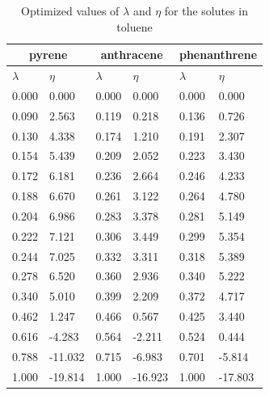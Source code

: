 \documentclass[
	12pt,				%
	openright,			%
	oneside,			%
	a4paper,			%
	english,			%
	brazil				%
	]{abntex2}
\begin{document}
\begin{apendicesenv}
\begin{table}[h]
	\centering
	\caption{Optimized values of $\lambda$ and $\eta$ for the solutes in toluene}
	\begin{tabular}{llllll}
		\hline
		\multicolumn{2}{c}{pyrene}& \multicolumn{2}{c}{anthracene}& \multicolumn{2}{c}{phenanthrene}\\
		\hline
		$\lambda$ & $\eta$ & $\lambda$ & $\eta$  & $\lambda$ & $\eta$   \\ 
		\hline
0.000	&	0.000	&	0.000	&	0.000	&	0.000	&	0.000	\\
0.090	&	2.563	&	0.119	&	0.218	&	0.136	&	0.726	\\
0.130	&	4.338	&	0.174	&	1.210	&	0.191	&	2.307	\\
0.154	&	5.439	&	0.209	&	2.052	&	0.223	&	3.430	\\
0.172	&	6.181	&	0.236	&	2.664	&	0.246	&	4.233	\\
0.188	&	6.670	&	0.261	&	3.122	&	0.264	&	4.780	\\
0.204	&	6.986	&	0.283	&	3.378	&	0.281	&	5.149	\\
0.222	&	7.121	&	0.306	&	3.449	&	0.299	&	5.354	\\
0.244	&	7.025	&	0.332	&	3.311	&	0.318	&	5.389	\\
0.278	&	6.520	&	0.360	&	2.936	&	0.340	&	5.222	\\
0.340	&	5.010	&	0.399	&	2.209	&	0.372	&	4.717	\\
0.462	&	1.247	&	0.466	&	0.567	&	0.425	&	3.440	\\
0.616	&	-4.283	&	0.564	&	-2.211	&	0.524	&	0.444	\\
0.788	&	-11.032	&	0.715	&	-6.983	&	0.701	&	-5.814	\\
1.000	&	-19.814	&	1.000	&	-16.923	&	1.000	&	-17.803	\\

		\hline
	\end{tabular}
\end{table}


\end{apendicesenv}
\end{document}
